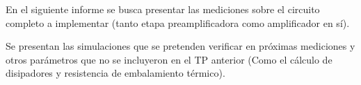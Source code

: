 En el siguiente informe se busca presentar las mediciones sobre el circuito completo a implementar (tanto etapa preamplificadora como amplificador en sí).

Se presentan las simulaciones que se pretenden verificar en próximas mediciones y otros parámetros que no se incluyeron en el TP anterior (Como el cálculo de disipadores y resistencia de embalamiento térmico).